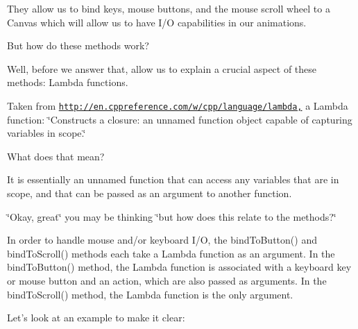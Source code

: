 They allow us to bind keys, mouse buttons, and the mouse scroll wheel to a Canvas which will allow us to have I/\-O capabilities in our animations.

But how do these methods work?

Well, before we answer that, allow us to explain a crucial aspect of these methods\-: Lambda functions.

Taken from \href{http://en.cppreference.com/w/cpp/language/lambda,}{\tt http\-://en.\-cppreference.\-com/w/cpp/language/lambda,} a Lambda function\-: \char`\"{}\-Constructs a closure\-: an unnamed function object capable of capturing variables in scope.\char`\"{}

What does that mean?

It is essentially an unnamed function that can access any variables that are in scope, and that can be passed as an argument to another function.

\char`\"{}\-Okay, great\char`\"{} you may be thinking \char`\"{}but how does this relate to the methods?\char`\"{}

In order to handle mouse and/or keyboard I/\-O, the {\ttfamily bind\-To\-Button()} and {\ttfamily bind\-To\-Scroll()} methods each take a Lambda function as an argument. In the {\ttfamily bind\-To\-Button()} method, the Lambda function is associated with a keyboard key or mouse button and an action, which are also passed as arguments. In the {\ttfamily bind\-To\-Scroll()} method, the Lambda function is the only argument.

Let's look at an example to make it clear\-:


